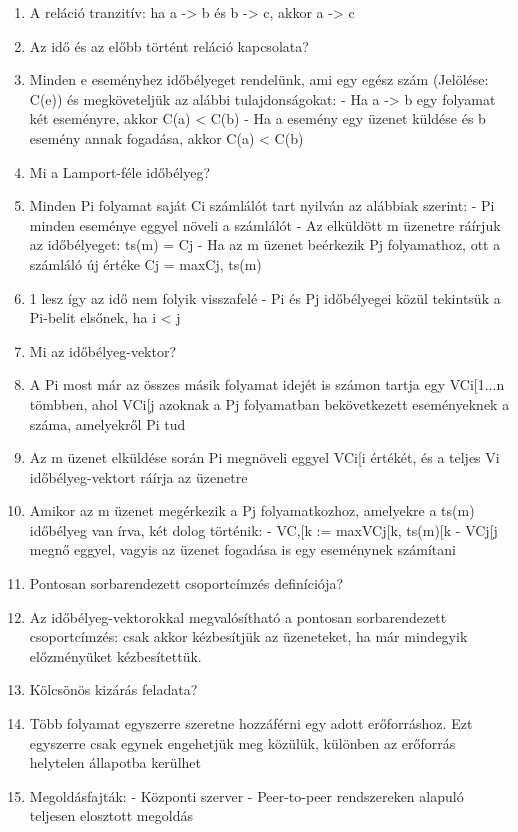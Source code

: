 \documentclass[twoside, a4paper, 12pt]{article}
\begin{document}
\begin{enumerate}
    \item A reláció tranzitív:  ha a -> b és b -> c, akkor a -> c
    \item  Az idő és az előbb történt reláció kapcsolata?
    \item Minden e eseményhez időbélyeget rendelünk, ami egy egész szám (Jelölése:  C(e)) és megköveteljük az alábbi tulajdonságokat:
        - Ha a -> b egy folyamat két eseményre, akkor C(a) < C(b)
        - Ha a esemény egy üzenet küldése és b esemény annak fogadása, akkor C(a) < C(b)
    \item  Mi a Lamport-féle időbélyeg?
    \item Minden Pi folyamat saját Ci számlálót tart nyilván az alábbiak szerint: 
        - Pi minden eseménye eggyel növeli a számlálót
        - Az elküldött m üzenetre ráírjuk az időbélyeget: ts(m) = Cj
        - Ha az m üzenet beérkezik Pj folyamathoz, ott a számláló új értéke Cj = max{Cj, ts(m)}\item1 lesz így az idő nem folyik visszafelé
        - Pi és Pj időbélyegei közül tekintsük a Pi-belit elsőnek, ha i < j
    \item  Mi az időbélyeg-vektor?
    \item A Pi most már az összes másik folyamat idejét is számon tartja egy VCi[1...n tömbben,
        ahol VCi[j azoknak a Pj folyamatban bekövetkezett eseményeknek a száma, amelyekről Pi tud
    \item Az m üzenet elküldése során Pi megnöveli eggyel  VCi[i értékét, és a teljes Vi időbélyeg-vektort ráírja az üzenetre
    \item Amikor az m üzenet megérkezik a Pj folyamatkozhoz, amelyekre a ts(m) időbélyeg van írva, két dolog történik:
        - VC,[k := max{VCj[k, ts(m)[k}
        - VCj[j megnő eggyel, vagyis az üzenet fogadása is egy eseménynek számítani
    \item  Pontosan sorbarendezett csoportcímzés definíciója?
    \item Az időbélyeg-vektorokkal megvalósítható a pontosan sorbarendezett csoportcímzés: csak akkor kézbesítjük az üzeneteket,
        ha már mindegyik előzményüket kézbesítettük.
    \item  Kölcsönös kizárás feladata?
    \item Több folyamat egyszerre szeretne hozzáférni egy adott erőforráshoz. Ezt egyszerre csak egynek engehetjük meg közülük,
        különben az erőforrás helytelen állapotba kerülhet
    \item Megoldásfajták: 
        - Központi szerver
        - Peer-to-peer rendszereken alapuló teljesen elosztott megoldás

\end{enumerate}
\end{document}
